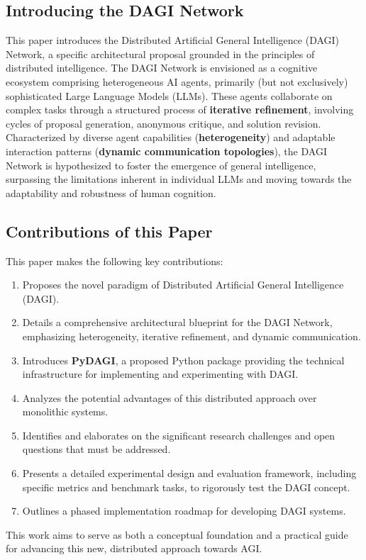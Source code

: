 \documentclass[12pt]{amsart}
\begin{document}
\subsection{Introducing the DAGI Network}
This paper introduces the Distributed Artificial General Intelligence (DAGI) Network, a specific architectural proposal grounded in the principles of distributed intelligence. The DAGI Network is envisioned as a cognitive ecosystem comprising heterogeneous AI agents, primarily (but not exclusively) sophisticated Large Language Models (LLMs). These agents collaborate on complex tasks through a structured process of \textbf{iterative refinement}, involving cycles of proposal generation, anonymous critique, and solution revision. Characterized by diverse agent capabilities (\textbf{heterogeneity}) and adaptable interaction patterns (\textbf{dynamic communication topologies}), the DAGI Network is hypothesized to foster the emergence of general intelligence, surpassing the limitations inherent in individual LLMs and moving towards the adaptability and robustness of human cognition.

\subsection{Contributions of this Paper}
This paper makes the following key contributions:
\begin{enumerate}[leftmargin=*]
    \item Proposes the novel paradigm of Distributed Artificial General Intelligence (DAGI).
    \item Details a comprehensive architectural blueprint for the DAGI Network, emphasizing heterogeneity, iterative refinement, and dynamic communication.
    \item Introduces \textbf{PyDAGI}, a proposed Python package providing the technical infrastructure for implementing and experimenting with DAGI.
    \item Analyzes the potential advantages of this distributed approach over monolithic systems.
    \item Identifies and elaborates on the significant research challenges and open questions that must be addressed.
    \item Presents a detailed experimental design and evaluation framework, including specific metrics and benchmark tasks, to rigorously test the DAGI concept.
    \item Outlines a phased implementation roadmap for developing DAGI systems.
\end{enumerate}
This work aims to serve as both a conceptual foundation and a practical guide for advancing this new, distributed approach towards AGI.
\end{document}
